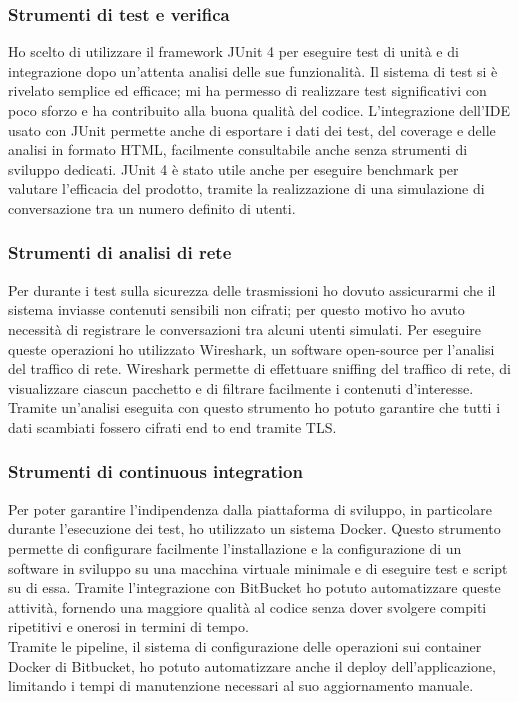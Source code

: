 		\subsubsection{Strumenti di test e verifica}
		Ho scelto di utilizzare il framework JUnit 4 per eseguire test di unità e di integrazione dopo un'attenta analisi delle sue funzionalità. Il sistema di test si è rivelato semplice ed efficace; mi ha permesso di realizzare test significativi con poco sforzo e ha contribuito alla buona qualità del codice. L'integrazione dell'IDE usato con JUnit permette anche di esportare i dati dei test, del coverage e delle analisi in formato HTML, facilmente consultabile anche senza strumenti di sviluppo dedicati. JUnit 4 è stato utile anche per eseguire benchmark per valutare l'efficacia del prodotto, tramite la realizzazione di una simulazione di conversazione tra un numero definito di utenti.
		
		\subsubsection{Strumenti di analisi di rete}
		Per durante i test sulla sicurezza delle trasmissioni ho dovuto assicurarmi che il sistema inviasse contenuti sensibili non cifrati; per questo motivo ho avuto necessità di registrare le conversazioni tra alcuni utenti simulati. Per eseguire queste operazioni ho utilizzato Wireshark, un software open-source per l'analisi del traffico di rete. Wireshark permette di effettuare sniffing del traffico di rete, di visualizzare ciascun pacchetto e di filtrare facilmente i contenuti d'interesse. Tramite un'analisi eseguita con questo strumento ho potuto garantire che tutti i dati scambiati fossero cifrati end to end tramite TLS.\@
		
		\subsubsection{Strumenti di continuous integration}
		Per poter garantire l'indipendenza dalla piattaforma di sviluppo, in particolare durante l'esecuzione dei test, ho utilizzato un sistema \gls{Docker}. Questo strumento permette di configurare facilmente l'installazione e la configurazione di un software in sviluppo su una macchina virtuale minimale e di eseguire test e script su di essa. Tramite l'integrazione con BitBucket ho potuto automatizzare queste attività, fornendo una maggiore qualità al codice senza dover svolgere compiti ripetitivi e onerosi in termini di tempo.
		\\
		Tramite le pipeline, il sistema di configurazione delle operazioni sui container \gls{Docker} di Bitbucket, ho potuto automatizzare anche il deploy dell'applicazione, limitando i tempi di manutenzione necessari al suo aggiornamento manuale.

